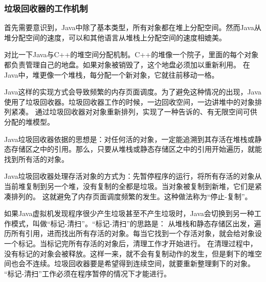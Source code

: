 \documentclass[a4paper,left=2.5cm,right=2.5cm,11pt]{article}
\begin{document}
\subsubsection{垃圾回收器的工作机制}
	首先需要意识到，Java中除了基本类型，所有对象都在堆上分配空间。然而Java从堆分配空间的速度，可以和其他语言从堆栈上分配空间的速度相媲美。\par
	对比一下Java与C++的堆空间分配机制。C++的堆像一个院子，里面的每个对象都负责管理自己的地盘。如果对象被销毁了，这个地盘必须加以重新利用。
	在Java中，堆更像一个堆栈，每分配一个新对象，它就往前移动一格。\par
	Java这样的实现方式会导致频繁的内存页面调度。为了避免这种情况的出现，Java使用了垃圾回收器。垃圾回收器工作的时候，一边回收空间，一边讲堆中的对象排列紧凑。
	通过垃圾回收器对对象重新排列，实现了一种告诉的、有无限空间可供分配的堆模型。\par
	Java垃圾回收器依据的思想是：对任何活的对象，一定能追溯到其存活在堆栈或静态存储区之中的引用。那么，只要从堆栈或静态存储区之中的引用开始遍历，就能找到所有活的对象。\par
	Java垃圾回收器处理存活对象的方式为：先暂停程序的运行，将所有存活的对象从当前堆复制到另一个堆，没有复制的全都是垃圾。当对象被复制到新堆，它们是紧凑排列的。
	这就避免了内存页面调度频繁的发生。这种做法称为“停止-复制”。\par
	如果Java虚拟机发现程序很少产生垃圾甚至不产生垃圾时，Java会切换到另一种工作模式，叫做“标记-清扫”。“标记-清扫”的思路是：
	从堆栈和静态存储区出发，遍历所有引用，进而找出所有存活的对象。每当它找到一个存活对象，就会给对象设一个标记。当标记完所有存活的对象后，清理工作才开始进行。
	在清理过程中，没有标记的对象会被释放。这样一来，就不会有复制动作的发生，但是剩下的堆空间也会不连续。垃圾回收器要是希望得到连续空间，就要重新整理剩下的对象。
	“标记-清扫”工作必须在程序暂停的情况下才能进行。
\end{document}
